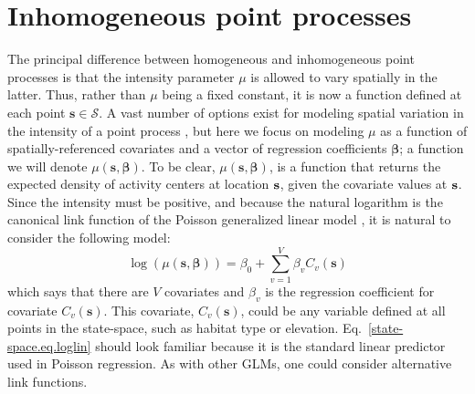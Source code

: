 \section{Inhomogeneous point processes}

The principal difference between homogeneous and inhomogeneous point
processes is that the intensity parameter $\mu$ is allowed to vary spatially
in the latter. Thus, rather than $\mu$ being a fixed constant,
it is now a function defined at each point $\mathbf{s} \in
\mathcal{S}$. A vast number of options exist for modeling spatial
variation in the intensity of a point process
\citep{cox:1955,stoyan_penttinen:2000,illian_etal:2008}, but here we
focus on modeling $\mu$ as a function of
spatially-referenced covariates and a vector of regression
coefficients $\bm \beta$; a function we will denote $\mu(\mathbf{s},
\bm{\beta})$. To be clear, $\mu(\mathbf{s}, \bm{\beta})$, is a
function that returns the expected density of activity centers at
location $\bf s$, given the covariate values at $\bf s$.  Since the
intensity must be positive, and because the natural logarithm is the
canonical link function of the Poisson generalized linear model
\citep{mccullagh_nelder:1989}, it is natural to consider the following model:
\begin{equation}
  \log(\mu(\mathbf{s}, {\bm \beta})) = \beta_0 + \sum_{v=1}^V \beta_v C_v(\mathbf{s})%
  \label{state-space.eq.loglin}
\end{equation}
which says that there are $V$ covariates and $\beta_v$ is the
regression coefficient for covariate $C_v(\mathbf{s})$. This
covariate, $C_v(\mathbf{s})$, could be any variable defined at all points
in the state-space, such as habitat type or elevation.
Eq.~\ref{state-space.eq.loglin} should look familiar because it is the
standard linear predictor used in Poisson regression. As with other
GLMs, one could consider alternative link functions.

